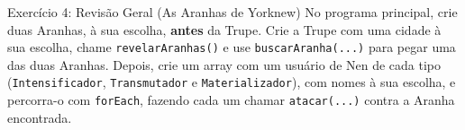 \begin{exercicio}{Exercício 4: Revisão Geral (As Aranhas de Yorknew)}
No programa principal, crie duas Aranhas, à sua escolha, \textbf{antes} da Trupe. Crie a Trupe
com uma cidade à sua escolha, chame \texttt{revelarAranhas()} e use
\texttt{buscarAranha(...)} para pegar uma das duas Aranhas. Depois, crie um array com um
usuário de Nen de cada tipo (\texttt{Intensificador}, \texttt{Transmutador} e
\texttt{Materializador}), com nomes à sua escolha, e percorra-o com \texttt{forEach}, fazendo
cada um chamar \texttt{atacar(...)} contra a Aranha encontrada.
\end{exercicio}
